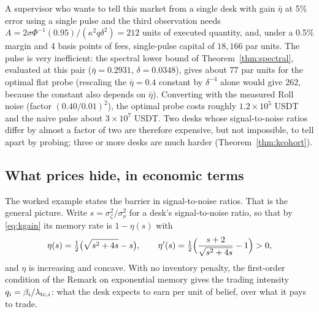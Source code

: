 \documentclass[12pt]{article}
\theoremstyle{definition}
\theoremstyle{remark}
\begin{document}
A supervisor who wants to tell this market from a single desk with gain $\bar\eta$ at 5\% error using a single pulse and the third observation needs $A=2\sigma\Phi^{-1}(0.95)/(\kappa^2q\delta^2)=212$ units of executed quantity, and, under a 0.5\% margin and 4 basis points of fees, single-pulse capital of $18{,}166$ par units. The pulse is very inefficient: the spectral lower bound of Theorem~\ref{thm:spectral}, evaluated at this pair ($\bar\eta=0.2931$, $\delta=0.0348$), gives about 77 par units for the optimal flat probe (rescaling the $\bar\eta=0.4$ constant by $\delta^{-4}$ alone would give 262, because the constant also depends on $\bar\eta$). Converting with the measured Roll noise (factor $(0.40/0.01)^2$), the optimal probe costs roughly $1.2\times10^5$ USDT and the naive pulse about $3\times10^7$ USDT. Two desks whose signal-to-noise ratios differ by almost a factor of two are therefore expensive, but not impossible, to tell apart by probing; three or more desks are much harder (Theorem~\ref{thm:kcohort}).

\subsection{What prices hide, in economic terms}\label{sec:primitives}

The worked example states the barrier in signal-to-noise ratios. That is the general picture. Write $s=\sigma_\zeta^2/\sigma_\nu^2$ for a desk's signal-to-noise ratio, so that by \eqref{eq:kgain} its memory rate is $1-\eta(s)$ with
\[
\eta(s)=\tfrac12\bigl(\sqrt{s^2+4s}-s\bigr),\qquad \eta'(s)=\tfrac12\Bigl(\frac{s+2}{\sqrt{s^2+4s}}-1\Bigr)>0 ,
\]
and $\eta$ is increasing and concave. With no inventory penalty, the first-order condition of the Remark on exponential memory gives the trading intensity $q_i=\beta_i/\lambda_{{\rm tc},i}$: what the desk expects to earn per unit of belief, over what it pays to trade.
\end{document}
